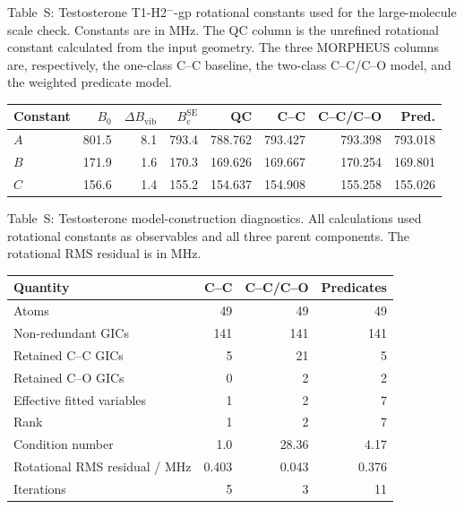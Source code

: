 \documentclass[12pt]{article}
\renewcommand{\thetable}{S\arabic{table}}
\begin{document}
\begin{center}
\label{tab:si-testosterone-rotconstants}
\parbox{0.94\linewidth}{\small Table~\thetable: Testosterone T1-H2$^{-}$-gp
rotational constants used for the large-molecule scale check. Constants are in
MHz. The QC column is the unrefined rotational constant calculated from the
input geometry. The three MORPHEUS columns are, respectively, the one-class
C--C baseline, the two-class C--C/C--O model, and the weighted predicate model.}

\smallskip
\begin{tabular}{lrrrrrrr}
\toprule
Constant & $B_0$ & $\Delta B_\mathrm{vib}$ & $B_e^\mathrm{SE}$ & QC & C--C & C--C/C--O & Pred. \\
\midrule
$A$ & 801.5 & 8.1 & 793.4 & 788.762 & 793.427 & 793.398 & 793.018 \\
$B$ & 171.9 & 1.6 & 170.3 & 169.626 & 169.667 & 170.254 & 169.801 \\
$C$ & 156.6 & 1.4 & 155.2 & 154.637 & 154.908 & 155.258 & 155.026 \\
\bottomrule
\end{tabular}
\end{center}

\begin{center}
\label{tab:si-testosterone-diagnostics}
\parbox{0.94\linewidth}{\small Table~\thetable: Testosterone
model-construction diagnostics. All calculations used rotational constants as
observables and all three parent components. The rotational RMS residual is in
MHz.}

\smallskip
\begin{tabular}{lrrr}
\toprule
Quantity & C--C & C--C/C--O & Predicates \\
\midrule
Atoms & 49 & 49 & 49 \\
Non-redundant GICs & 141 & 141 & 141 \\
Retained C--C GICs & 5 & 21 & 5 \\
Retained C--O GICs & 0 & 2 & 2 \\
Effective fitted variables & 1 & 2 & 7 \\
Rank & 1 & 2 & 7 \\
Condition number & 1.0 & 28.36 & 4.17 \\
Rotational RMS residual / MHz & 0.403 & 0.043 & 0.376 \\
Iterations & 5 & 3 & 11 \\
\bottomrule
\end{tabular}
\end{center}
\end{document}
